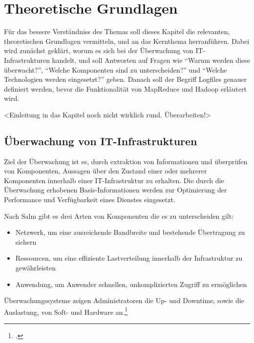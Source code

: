 
\chapter{Theoretische Grundlagen}\label{cha:Grundlagen}
Für das bessere Verständniss des Themas soll dieses Kapitel die relevanten, theoretischen Grundlagen vermitteln,  und an das Kernthema herranführen. Dabei wird zunächst geklärt, worum es sich bei der Überwachung von IT-Infrastrukturen handelt, und soll Antworten auf Fragen wie "`Warum werden diese überwacht?"', "`Welche Komponenten sind zu unterscheiden?"' und "`Welche Technologien werden eingesetzt?"' geben. Danach soll der Begriff Logfiles genauer definiert werden, bevor die Funktionalität von MapReduce und Hadoop erläutert wird.

<Einleitung in das Kapitel noch nicht wirklich rund. Überarbeiten!>


\section{Überwachung von IT-Infrastrukturen}\label{sec:UeberwachungIT}
Ziel der Überwachung ist es, durch extraktion von Informationen und überprüfen von Komponenten, Aussagen über den Zustand einer oder mehrerer Komponenten innerhalb einer IT-Infrastruktur zu erhalten. Die durch die Überwachung erhobenen Basis-Informationen werden zur Optimierung der Performance und Verfügbarkeit eines Dienstes eingesetzt.

Nach Salm gibt es drei Arten von Komponenten die es zu unterscheiden gilt:

\begin{itemize}
	\item Netzwerk, um eine ausreichende Bandbreite und bestehende Übertragung zu sichern
	\item Ressourcen, um eine effiziente Lastverteilung innerhalb der Infrastruktur zu gewährleisten
	\item Anwendung, um Anwender schnellen, unkomplizierten Zugriff zu ermöglichen
\end{itemize}

Überwachungssysteme zeigen Administratoren die Up- und Downtime, sowie die Auslastung, von Soft- und Hardware an.\footcite[Vgl.][S. 8]{Salm.2007}

